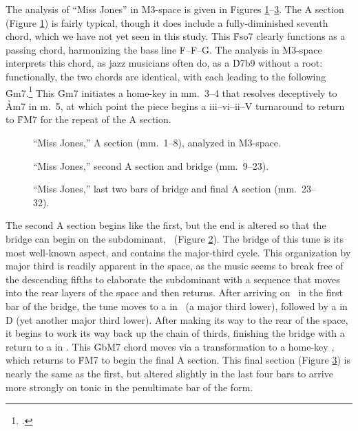The analysis of ``Miss Jones'' in M3-space is given in Figures
\ref{maj3:miss-jones-a}--\ref{maj3:miss-jones-c}. The A section (Figure
\ref{maj3:miss-jones-a}) is fairly typical, though it does include a
fully-diminished seventh chord, which we have not yet seen in this study. This
\h{Fso7} clearly functions as a passing chord, harmonizing the bass line
F--F\sharp--G. The analysis in M3-space interprets this chord, as jazz
musicians often do, as a \h{D7b9} without a root: functionally, the two chords
are identical, with each leading to the following \h{Gm7}.\footcite[85]{levine:1995} This
\h{Gm7} initiates a home-key \tf in mm.~3--4 that resolves deceptively to
\h{Am7} in m.~5, at which point the piece begins a iii--vi--ii--V turnaround
to return to \h{FM7} for the repeat of the A section.

\begin{figure}[tbp]
  \ContinuedFloat
  \caption{``Miss Jones,'' A section (mm.~1--8), analyzed in M3-space.}
\label{maj3:miss-jones-a}
\end{figure}

\begin{figure}[tbp]
  \ContinuedFloat
  \caption{``Miss Jones,'' second A section and bridge (mm.~9--23).}
\label{maj3:miss-jones-b}
\end{figure}

\begin{figure}[tbp]
  \ContinuedFloat
  \caption{``Miss Jones,'' last two bars of bridge and final A section
    (mm.~23--32).}
\label{maj3:miss-jones-c}
\end{figure}

The second A section begins like the first, but the end is altered so that the
bridge can begin on the subdominant, \Bflat\ (Figure \ref{maj3:miss-jones-b}).
The bridge of this tune is its most well-known aspect, and contains the
major-third cycle. This organization by major third is readily apparent in
the space, as the music seems to break free of the descending fifths to
elaborate the subdominant with a sequence that moves into the rear layers of
the space and then returns. After arriving on \Bflat\ in the first bar of the
bridge, the tune moves to a \tfo in \Gflat\ (a major third lower), followed by
a \tfo in D (yet another major third lower). After making its way to the rear
of the space, it begins to work its way back up the chain of thirds, finishing
the bridge with a return to a \tfo in \Gflat. This \h{GbM7} chord moves via a
\slideS transformation to a home-key \tfo, which returns to \h{FM7} to begin
the final A section. This final section (Figure \ref{maj3:miss-jones-c}) is
nearly the same as the first, but altered slightly in the last four bars to
arrive more strongly on tonic in the penultimate bar of the form.

